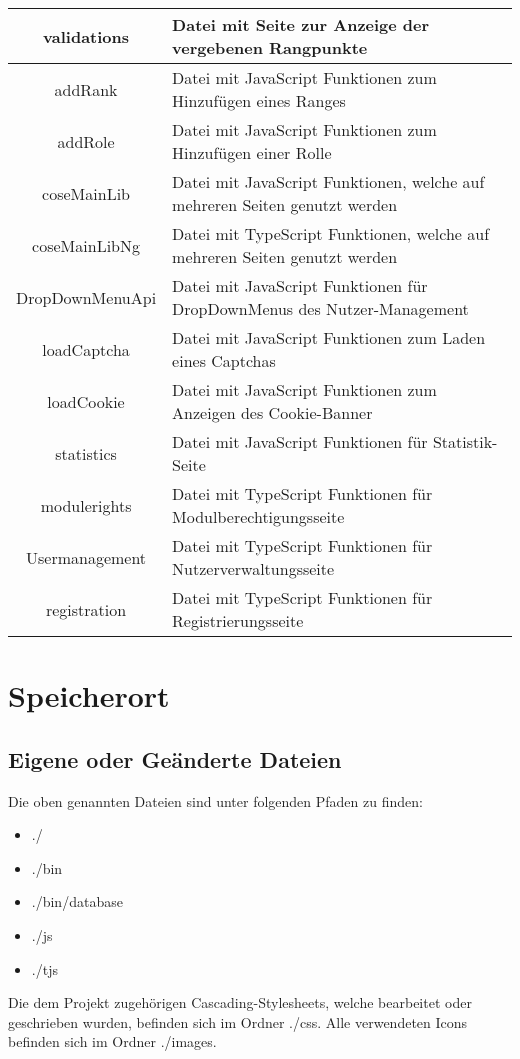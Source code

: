 \begin{longtable}[H]{|c|p{10cm}|}
	validations                  & Datei mit Seite zur Anzeige der vergebenen Rangpunkte \\ \hline
	addRank                      & Datei mit JavaScript Funktionen zum Hinzufügen eines Ranges \\ \hline
	addRole                      & Datei mit JavaScript Funktionen zum Hinzufügen einer Rolle \\ \hline
	coseMainLib                  & Datei mit JavaScript Funktionen, welche auf mehreren Seiten genutzt werden \\ \hline
	coseMainLibNg                & Datei mit TypeScript Funktionen, welche auf mehreren Seiten genutzt werden \\ \hline
	DropDownMenuApi              & Datei mit JavaScript Funktionen für DropDownMenus des Nutzer-Management \\ \hline
	loadCaptcha                  & Datei mit JavaScript Funktionen zum Laden eines Captchas \\ \hline
	loadCookie                   & Datei mit JavaScript Funktionen zum Anzeigen des Cookie-Banner \\ \hline
	statistics                   & Datei mit JavaScript Funktionen für Statistik-Seite \\ \hline
	modulerights                 & Datei mit TypeScript Funktionen für Modulberechtigungsseite \\ \hline
	Usermanagement               & Datei mit TypeScript Funktionen für Nutzerverwaltungsseite \\ \hline
	registration                 & Datei mit TypeScript Funktionen für Registrierungsseite \\ \hline
\end{longtable}
\section{Speicherort}
\subsection{Eigene oder Geänderte Dateien}
Die oben genannten Dateien sind unter folgenden Pfaden zu finden:
\begin{itemize}
	\item {\glqq ./\grqq}
	\item {\glqq ./bin\grqq}
	\item {\glqq ./bin/database\grqq}
	\item {\glqq ./js\grqq}
	\item {\glqq ./tjs\grqq}
\end{itemize}
Die dem Projekt zugehörigen Cascading-Stylesheets, welche bearbeitet oder geschrieben wurden, befinden sich im Ordner {\glqq ./css\grqq}. Alle verwendeten Icons befinden sich im Ordner {\glqq ./images\grqq}.
